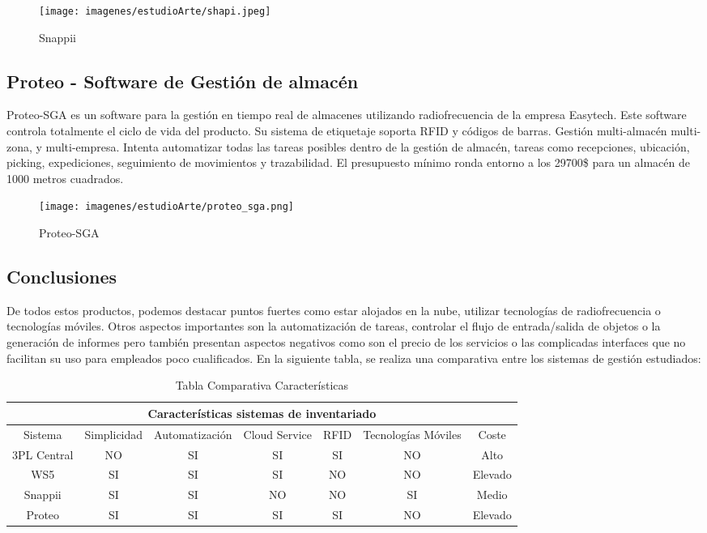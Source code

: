 \documentclass[a4paper,11pt]{book}
\begin{document}
\begin{figure}[H]  
\centering 
\texttt{[image: imagenes/estudioArte/shapi.jpeg]}
\caption{Snappii\cite{snpE}}  
\end{figure}


\subsection{Proteo - Software de Gestión de almacén}
Proteo-SGA\cite{pro} es un software para la gestión en tiempo real de almacenes utilizando radiofrecuencia de la empresa Easytech\cite{easy}. Este software controla totalmente el ciclo de vida del producto. Su sistema de etiquetaje soporta RFID y códigos de barras. Gestión multi-almacén multi-zona, y multi-empresa. Intenta automatizar todas las tareas posibles dentro de la gestión de almacén, tareas como recepciones, ubicación, picking, expediciones, seguimiento de movimientos y trazabilidad. El presupuesto mínimo ronda entorno a los 29700\$ para un almacén de 1000 metros cuadrados.  

\begin{figure}[H]  
\centering 
\texttt{[image: imagenes/estudioArte/proteo\_sga.png]}
\caption{Proteo-SGA\cite{pro2}}  
\end{figure}




\subsection{Conclusiones}

De todos estos productos, podemos destacar puntos fuertes como estar alojados en la nube, utilizar tecnologías de radiofrecuencia o tecnologías móviles. Otros aspectos importantes son la automatización de tareas, controlar el flujo de entrada/salida de objetos o la generación de informes pero también presentan aspectos negativos como son el precio de los servicios o las complicadas interfaces que no facilitan su uso para empleados poco cualificados. En la siguiente tabla, se realiza una comparativa entre los sistemas de gestión estudiados:

\begin{table}[htb]
\centering
\begin{tabular}{|c|c|c|c|c|c|c|}
\hline
\multicolumn{7}{|c|}{Características sistemas de inventariado } \\ \hline
Sistema & Simplicidad & Automatización  & Cloud Service & RFID & Tecnologías Móviles & Coste
\\
\hline 
3PL Central & NO & SI & SI & SI & NO & Alto \\ \hline
WS5 & SI & SI & SI & NO & NO & Elevado \\ \hline
Snappii & SI & SI & NO & NO & SI & Medio \\ \hline
Proteo & SI & SI & SI & SI & NO & Elevado \\ \hline
\end{tabular}
\caption{Tabla Comparativa Características}
\end{table}
\end{document}

